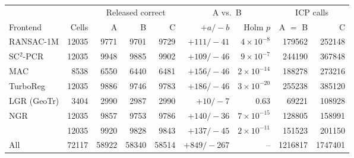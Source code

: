 \footnotesize\setlength{\tabcolsep}{3pt}%
\begin{tabular}{lrrrrrrrr}
\toprule
& & \multicolumn{3}{c}{Released correct} & \multicolumn{2}{c}{A vs.\ B} & \multicolumn{2}{c}{ICP calls} \\
\cmidrule(lr){3-5}\cmidrule(lr){6-7}\cmidrule(lr){8-9}
Frontend & Cells & A & B & C & $+a/{-}b$ & Holm $p$ & A $=$ B & C \\
\midrule
RANSAC-1M & 12035 & 9771 & 9701 & 9729 & $+111/{-}41$ & $4\times10^{-8}$ & 179562 & 252148 \\
SC$^2$-PCR & 12035 & 9948 & 9885 & 9902 & $+109/{-}46$ & $9\times10^{-7}$ & 244190 & 367848 \\
MAC & 8538 & 6550 & 6440 & 6481 & $+156/{-}46$ & $2\times10^{-14}$ & 188278 & 273216 \\
TurboReg & 12035 & 9886 & 9746 & 9783 & $+186/{-}46$ & $3\times10^{-20}$ & 255238 & 385120 \\
LGR (GeoTr) & 3404 & 2990 & 2987 & 2990 & $+10/{-}7$ & 0.63 & 69221 & 108928 \\
NGR & 12035 & 9857 & 9753 & 9786 & $+140/{-}36$ & $7\times10^{-15}$ & 128805 & 158991 \\
\ls{} & 12035 & 9920 & 9828 & 9843 & $+137/{-}45$ & $2\times10^{-11}$ & 151523 & 201150 \\
\midrule
All & 72117 & 58922 & 58340 & 58514 & $+849/{-}267$ & -- & 1216817 & 1747401 \\
\bottomrule
\end{tabular}%

